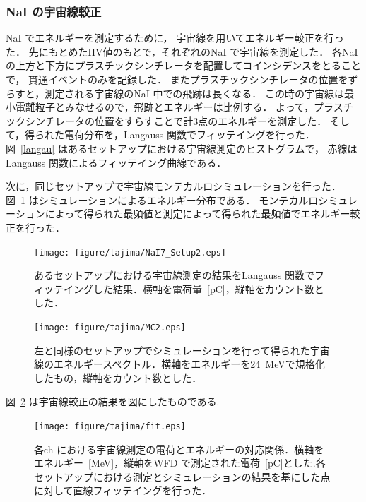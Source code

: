 \newpage

\subsubsection{NaI の宇宙線較正}
NaI でエネルギーを測定するために， 宇宙線を用いてエネルギー較正を行った．
先にもとめたHV値のもとで，それぞれのNaI で宇宙線を測定した．
各NaI の上方と下方にプラスチックシンチレータを配置してコインシデンスをとることで，
貫通イベントのみを記録した．
またプラスチックシンチレータの位置をずらすと，測定される宇宙線のNaI 中での飛跡は長くなる．
この時の宇宙線は最小電離粒子とみなせるので，飛跡とエネルギーは比例する．
よって，プラスチックシンチレータの位置をすらすことで計3点のエネルギーを測定した．
そして，得られた電荷分布を，Langauss 関数でフィッテイングを行った．
図~\ref{langau} はあるセットアップにおける宇宙線測定のヒストグラムで，
赤線はLangauss 関数によるフィッテイング曲線である．

次に，同じセットアップで宇宙線モンテカルロシミュレーションを行った．
図~\ref{MC2} はシミュレーションによるエネルギー分布である．
モンテカルロシミュレーションによって得られた最頻値と測定によって得られた最頻値でエネルギー較正を行った．

\begin{figure}[H]
\begin{minipage}{0.45\hsize}
\centering
\hspace*{-1em}
\texttt{[image: figure/tajima/NaI7\_Setup2.eps]}
\caption{あるセットアップにおける宇宙線測定の結果をLangauss 関数でフィッテイングした結果．横軸を電荷量~[pC]，縦軸をカウント数とした．}\label{langau}
\end{minipage}\hfill
\begin{minipage}{0.45\hsize}
\centering
\texttt{[image: figure/tajima/MC2.eps]}
\caption{左と同様のセットアップでシミュレーションを行って得られた宇宙線のエネルギースペクトル．横軸をエネルギーを24~MeVで規格化したもの，縦軸をカウント数とした．}\label{MC2}
\end{minipage}
\end{figure}

図~\ref{cali} は宇宙線較正の結果を図にしたものである.
\begin{figure}[H]
\centering
\texttt{[image: figure/tajima/fit.eps]}
\caption{各ch における宇宙線測定の電荷とエネルギーの対応関係．横軸をエネルギー~[MeV]，縦軸をWFD で測定された電荷~[pC]とした.各セットアップにおける測定とシミュレーションの結果を基にした点に対して直線フィッテイングを行った．}\label{cali}
\end{figure}

